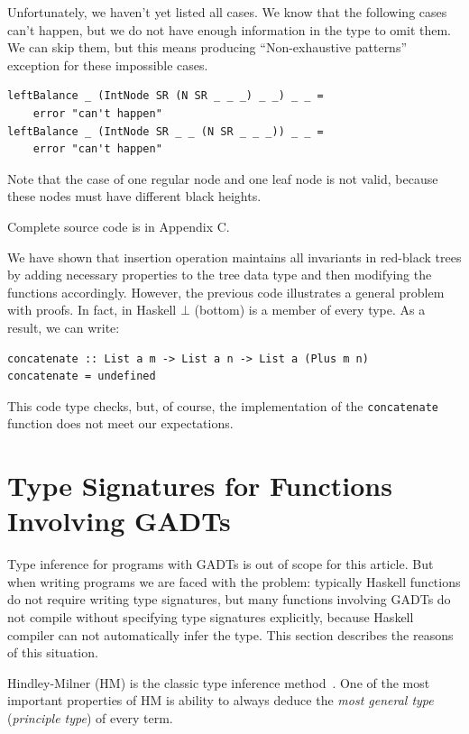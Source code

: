 \documentclass{tmr}
\newcommand{\italic}[1]{\textit{#1}}
\begin{document}
Unfortunately, we haven't yet listed all cases. We know that the following cases can't happen, but we do not have enough information in the type to omit them. We can skip them, but this means producing ``Non-exhaustive patterns'' exception for these impossible cases.

\begin{Verbatim}
leftBalance _ (IntNode SR (N SR _ _ _) _ _) _ _ =
    error "can't happen"
leftBalance _ (IntNode SR _ _ (N SR _ _ _)) _ _ =
    error "can't happen"
\end{Verbatim}

Note that the case of one regular node and one leaf node is not valid, because these nodes must have different black heights.

Complete source code is in Appendix C.

We have shown that insertion operation maintains all invariants in red-black trees by adding necessary properties to the tree data type and then modifying the functions accordingly. However, the previous code illustrates a general problem with proofs. In fact, in Haskell $\bot$ (bottom) is a member of every type. As a result, we can write:

\begin{Verbatim}
concatenate :: List a m -> List a n -> List a (Plus m n)
concatenate = undefined
\end{Verbatim}

This code type checks, but, of course, the implementation of the \verb|concatenate| function does not meet our expectations.

\section{Type Signatures for Functions Involving GADTs}
\label{sec:type_signatures}

Type inference for programs with GADTs is out of scope for this article. But when writing programs we are faced with the problem: typically Haskell functions do not require writing type signatures, but many functions involving GADTs do not compile without specifying type signatures explicitly, because Haskell compiler can not automatically infer the type. This section describes the reasons of this situation.

Hindley-Milner (HM) is the classic type inference method~\cite{cardelli_typechecking}. One of the most important properties of HM is ability to always deduce the \italic{most general type} (\italic{principle type}) of every term.
\end{document}
